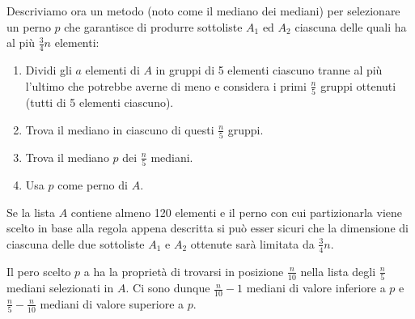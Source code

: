 Descriviamo ora un metodo (noto come il mediano dei mediani) per selezionare un perno $p$ che garantisce di produrre sottoliste $A_1$ ed $A_2$ ciascuna delle quali ha al più $\frac{3}{4}n$ elementi:
\begin{enumerate}
    \item Dividi gli $a$ elementi di $A$ in gruppi di 5 elementi ciascuno tranne al più l'ultimo che potrebbe averne di meno e considera i primi $\frac{n}{5}$ gruppi ottenuti (tutti di 5 elementi ciascuno).
    \item Trova il mediano in ciascuno di questi $\frac{n}{5}$ gruppi.
    \item Trova il mediano $p$ dei $\frac{n}{5}$ mediani.
    \item Usa $p$ come perno di $A$.
\end{enumerate}

Se la lista $A$ contiene almeno 120 elementi e il perno con cui partizionarla viene scelto in base alla regola appena descritta si può esser sicuri che la dimensione di ciascuna delle due sottoliste $A_1$ e $A_2$ ottenute sarà limitata da $\frac{3}{4}n$.

Il pero scelto $p$ a ha la proprietà di trovarsi in posizione $\frac{n}{10}$ nella lista degli $\frac{n}{5}$ mediani selezionati in $A$. Ci sono dunque $\frac{n}{10}-1$ mediani di valore inferiore a $p$ e $\frac{n}{5}-\frac{n}{10}$ mediani di valore superiore a $p$.

